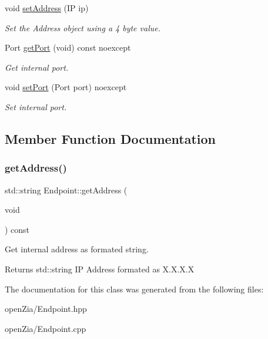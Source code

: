 \begin{DoxyCompactItemize}
\mbox{\label{classo_z_1_1_endpoint_a7259041c3bef1408d9a8c85c67a7b378}} 
void \mbox{\hyperlink{classo_z_1_1_endpoint_a7259041c3bef1408d9a8c85c67a7b378}{set\+Address}} (IP ip)
\begin{DoxyCompactList}\small\item\em Set the Address object using a 4 byte value. \end{DoxyCompactList}\item 
\mbox{\label{classo_z_1_1_endpoint_aad983948594b295187d6117f99b1988d}} 
Port \mbox{\hyperlink{classo_z_1_1_endpoint_aad983948594b295187d6117f99b1988d}{get\+Port}} (void) const noexcept
\begin{DoxyCompactList}\small\item\em Get internal port. \end{DoxyCompactList}\item 
\mbox{\label{classo_z_1_1_endpoint_a2f7fda5ee5e4645a8b9a55de9e534f1a}} 
void \mbox{\hyperlink{classo_z_1_1_endpoint_a2f7fda5ee5e4645a8b9a55de9e534f1a}{set\+Port}} (Port port) noexcept
\begin{DoxyCompactList}\small\item\em Set internal port. \end{DoxyCompactList}\end{DoxyCompactItemize}


\subsection{Member Function Documentation}
\mbox{\label{classo_z_1_1_endpoint_a27a680dbcdf1c89bb10fcbaca969edab}} 
\subsubsection{\texorpdfstring{getAddress()}{getAddress()}}
{\footnotesize\ttfamily std\+::string Endpoint\+::get\+Address (\begin{DoxyParamCaption}\item[{void}]{ }\end{DoxyParamCaption}) const\hspace{0.3cm}{\ttfamily [noexcept]}}



Get internal address as formated string. 

\begin{DoxyReturn}{Returns}
std\+::string IP Address formated as \textquotesingle{}X.\+X.\+X.\+X\textquotesingle{} 
\end{DoxyReturn}


The documentation for this class was generated from the following files\+:\begin{DoxyCompactItemize}
\item 
open\+Zia/Endpoint.\+hpp\item 
open\+Zia/Endpoint.\+cpp\end{DoxyCompactItemize}
